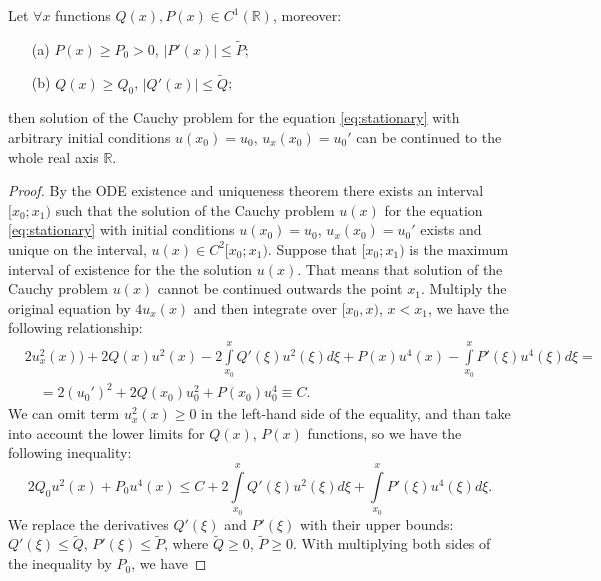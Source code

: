 \begin{proposition}
	Let $\forall x$ functions $Q(x), P(x) \in C^1(\mathbb{R})$, moreover:
	\begin{enumerate}
		\item[(a)] $P(x) \ge P_0 > 0$, $|P'(x)| \le \widetilde{P}$;
		\item[(b)] $Q(x) \ge Q_0$, $|Q'(x)| \le \widetilde{Q}$;
	\end{enumerate}
	then  solution of the Cauchy problem for the equation \eqref{eq:stationary} with arbitrary initial conditions $u(x_0) = u_0$, $u_{x}(x_0) = u_0'$ can be continued to the whole real axis $\mathbb{R}$. 
	\label{prop:absense-of-singular-solutions}
\end{proposition}
\begin{proof}
	By the ODE existence and uniqueness theorem there exists an interval $[x_0; x_1)$ such that the solution of the Cauchy problem $u(x)$ for the equation \eqref{eq:stationary} with initial conditions $u(x_0) = u_0$, $u_{x}(x_0) = u_0'$ exists and unique on the interval, $u(x) \in C^2[x_0; x_1)$.
	Suppose that $[x_0; x_1)$ is the maximum interval of existence for the the solution $u(x)$.
	That means that solution of the Cauchy problem $u(x)$ cannot be continued outwards the point $x_1$.
	Multiply the original equation by $4u_{x}(x)$ and then integrate over $[x_0, x)$, $x < x_1$, we have the following relationship:
	\begin{equation}
	\begin{aligned}
		& 2 u_x^2(x)) + 2 Q(x) u^2(x) - 2 \int \limits_{x_0}^{x} Q'(\xi) u^2(\xi) d\xi + P(x) u^4(x) - \int \limits_{x_0}^x P'(\xi) u^4(\xi) d\xi = \\
		& \quad = 2 (u_0')^2 + 2 Q(x_0) u_0^2 + P(x_0) u_0^4 \equiv C.
		\label{eq:aux-04}
	\end{aligned}	
	\end{equation}
	We can omit term $u_{x}^2(x) \ge 0$ in the left-hand side of the equality, and than take into account the lower limits for $Q(x)$, $P(x)$ functions, so we have the following inequality:
	\begin{equation}
		2 Q_0 u^2(x) + P_0 u^4(x) \le C + 2 \int \limits_{x_0}^{x} Q'(\xi) u^2(\xi) d\xi + \int \limits_{x_0}^{x} P'(\xi) u^4(\xi) d\xi.
	\end{equation}
	We replace the derivatives $Q'(\xi)$ and $P'(\xi)$ with their upper bounds: $Q'(\xi) \le \widetilde{Q}$, $P'(\xi) \le \widetilde{P}$, where $\widetilde{Q} \ge 0$, $\widetilde{P} \ge 0$.
	With multiplying both sides of the inequality by $P_0$, we have

\end{proof}
